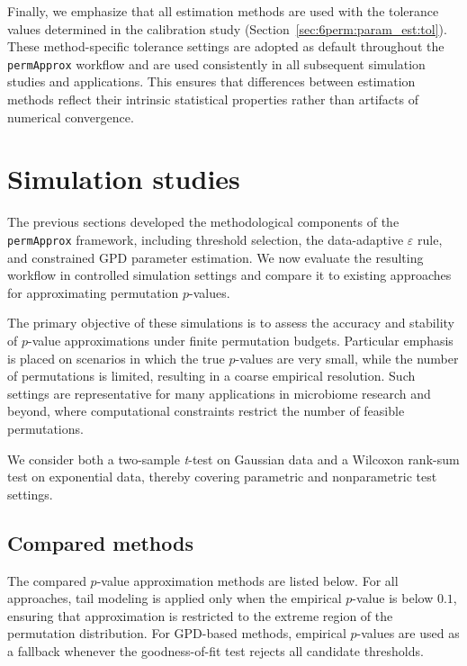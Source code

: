 Finally, we emphasize that all estimation methods are used with the tolerance values determined in the calibration study (Section~\ref{sec:6perm:param_est:tol}). These method-specific tolerance settings are adopted as default throughout the \texttt{permApprox} workflow and are used consistently in all subsequent simulation studies and applications. 
This ensures that differences between estimation methods reflect their intrinsic statistical properties rather than artifacts of numerical convergence.

\section{Simulation studies}
\label{sec:6perm:simulations}

The previous sections developed the methodological components of the \texttt{permApprox} framework, including threshold selection, the data-adaptive $\varepsilon$ rule, and constrained GPD parameter estimation. We now evaluate the resulting workflow in controlled simulation settings and compare it to existing approaches for approximating permutation $p$-values.

The primary objective of these simulations is to assess the accuracy and stability of $p$-value approximations under finite permutation budgets. Particular emphasis is placed on scenarios in which the true $p$-values are very small, while the number of permutations is limited, resulting in a coarse empirical resolution. Such settings are representative for many applications in microbiome research and beyond, where computational constraints restrict the number of feasible permutations.
 
We consider both a two-sample \textit{t}-test on Gaussian data and a Wilcoxon rank-sum test on exponential data, thereby covering parametric and nonparametric test settings.

\subsection{Compared methods}
\label{sec:6perm:sim:methods}

The compared $p$-value approximation methods are listed below.
For all approaches, tail modeling is applied only when the empirical $p$-value is below $0.1$, ensuring that approximation is restricted to the extreme region of the permutation distribution. For GPD-based methods, empirical $p$-values are used as a fallback whenever the goodness-of-fit test rejects all candidate thresholds.


